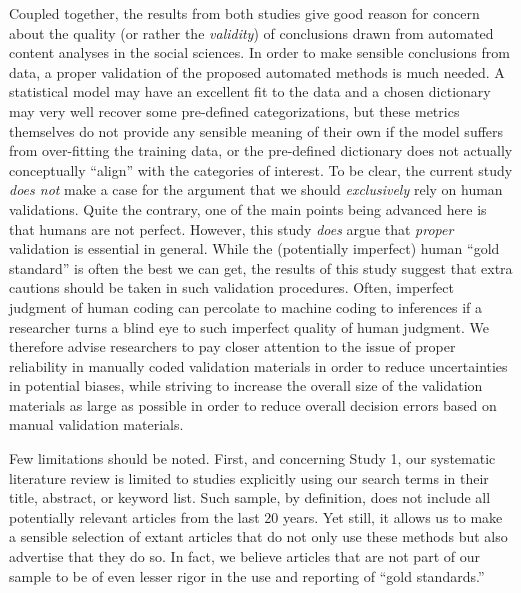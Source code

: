 \documentclass[man, floatsintext, 12pt, a4paper, noextraspace]{apa6}
\begin{document}
    Coupled together, the results from both studies give good reason for concern about the quality (or rather the \textit{validity}) of conclusions drawn from automated content analyses in the social sciences. In order to make sensible conclusions from data, a proper validation of the proposed automated methods is much needed. A statistical model may have an excellent fit to the data and a chosen dictionary may very well recover some pre-defined categorizations, but these metrics themselves do not provide any sensible meaning of their own if the model suffers from over-fitting the training data, or the pre-defined dictionary does not actually conceptually \enquote{align} with the categories of interest. To be clear, the current study \textit{does not} make a case for the argument that we should \textit{exclusively} rely on human validations. Quite the contrary, one of the main points being advanced here is that humans are not perfect. However, this study \textit{does} argue that \textit{proper} validation is essential in general. While the (potentially imperfect) human \enquote{gold standard} is often the best we can get, the results of this study suggest that extra cautions should be taken in such validation procedures. Often, imperfect judgment of human coding can percolate to machine coding to inferences if a researcher turns a blind eye to such imperfect quality of human judgment. We therefore advise researchers to pay closer attention to the issue of proper reliability in manually coded validation materials in order to reduce uncertainties in potential biases, while striving to increase the overall size of the validation materials as large as possible in order to reduce overall decision errors based on manual validation materials.    

    Few limitations should be noted. First, and concerning Study 1, our systematic literature review is limited to studies explicitly using our search terms in their title, abstract, or keyword list. Such sample, by definition, does not include all potentially relevant articles from the last 20 years. Yet still, it allows us to make a sensible selection of extant articles that do not only use these methods but also advertise that they do so. In fact, we believe articles that are not part of our sample to be of even lesser rigor in the use and reporting of \enquote{gold standards.}
    
\end{document}
